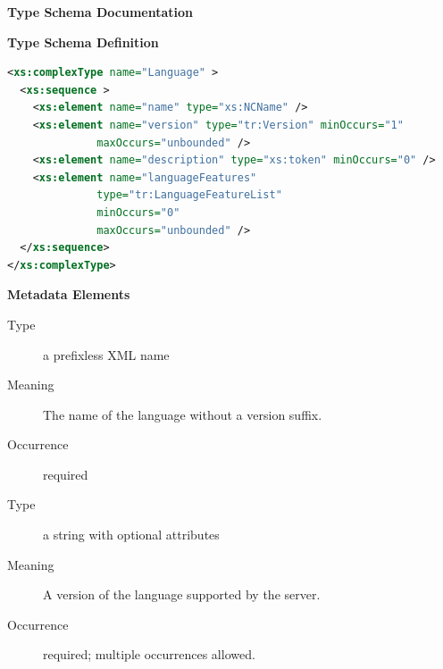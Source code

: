 \documentclass{ivoa}
\begin{document}
\begin{generated}
\begingroup
        \renewcommand*\descriptionlabel[1]{%
        \hbox to 5.5em{\emph{#1}\hfil}}\vspace{2ex}\noindent\textbf{ Type Schema Documentation}



\vspace{1ex}\noindent\textbf{ Type Schema Definition}

\begin{lstlisting}[language=XML,basicstyle=\footnotesize]
<xs:complexType name="Language" >
  <xs:sequence >
    <xs:element name="name" type="xs:NCName" />
    <xs:element name="version" type="tr:Version" minOccurs="1"
              maxOccurs="unbounded" />
    <xs:element name="description" type="xs:token" minOccurs="0" />
    <xs:element name="languageFeatures"
              type="tr:LanguageFeatureList"
              minOccurs="0"
              maxOccurs="unbounded" />
  </xs:sequence>
</xs:complexType>
\end{lstlisting}

\vspace{0.5ex}\noindent\textbf{ Metadata Elements}

\begingroup\small\begin{bigdescription}\item[Element \xmlel{name}]
\begin{description}
\item[Type] a prefixless XML name
\item[Meaning] The name of the language without a version suffix.
\item[Occurrence] required

\end{description}
\item[Element \xmlel{version}]
\begin{description}
\item[Type] a string with optional attributes
\item[Meaning] A version of the language supported by the server.
\item[Occurrence] required; multiple occurrences allowed.


\end{description}
\end{bigdescription}
\end{generated}
\end{document}
